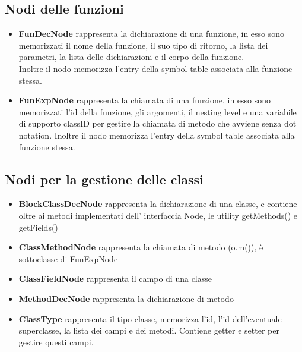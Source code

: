 \documentclass[a4paper]{article}   %
\begin{document}

\subsection{Nodi delle funzioni}
\begin{itemize}
  \item \textbf{FunDecNode} rappresenta la dichiarazione di una funzione, in esso sono memorizzati
  il nome della funzione, il suo tipo di ritorno, la lista dei parametri, la lista delle dichiarazioni e il corpo della funzione.\\
  Inoltre il nodo memorizza l'entry della symbol table associata alla funzione stessa.
  \item \textbf{FunExpNode} rappresenta la chiamata di una funzione, in esso sono memorizzati l'id della funzione,
  gli argomenti, il nesting level e una variabile di supporto classID per gestire la chiamata di metodo che avviene senza dot notation.
  Inoltre il nodo memorizza l'entry della symbol table associata alla funzione stessa.


\end{itemize}

\subsection{Nodi per la gestione delle classi}
\begin{itemize}
  \item \textbf{BlockClassDecNode} rappresenta la dichiarazione di una classe, e contiene oltre ai metodi implementati dell'
  interfaccia Node, le utility getMethods() e getFields()
  \item \textbf{ClassMethodNode} rappresenta la chiamata di metodo (o.m()), è sottoclasse di FunExpNode
  \item \textbf{ClassFieldNode} rappresenta il campo di una classe
  \item \textbf{MethodDecNode} rappresenta la dichiarazione di metodo
  \item \textbf{ClassType} rappresenta il tipo classe, memorizza l'id, l'id dell'eventuale superclasse, la lista dei campi e dei metodi.
  Contiene getter e setter per gestire questi campi.
\end{itemize}
\end{document}
